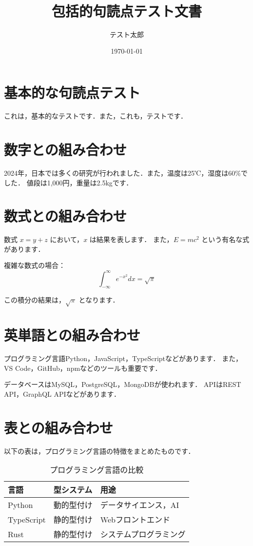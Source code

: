 \documentclass{article}
\title{包括的句読点テスト文書}
\author{テスト太郎}
\date{\today}
\begin{document}
\maketitle

\section{基本的な句読点テスト}

これは，基本的なテストです．また，これも，テストです．

\section{数字との組み合わせ}

2024年，日本では多くの研究が行われました．また，温度は25℃，湿度は60\%でした．
値段は1,000円，重量は2.5kgです．

\section{数式との組み合わせ}

数式 $x = y + z$ において，$x$ は結果を表します．
また，$E = mc^2$ という有名な式があります．

複雑な数式の場合：
\begin{equation}
\int_{-\infty}^{\infty} e^{-x^2} dx = \sqrt{\pi}
\end{equation}

この積分の結果は，$\sqrt{\pi}$ となります．

\section{英単語との組み合わせ}

プログラミング言語Python，JavaScript，TypeScriptなどがあります．
また，VS Code，GitHub，npmなどのツールも重要です．

データベースはMySQL，PostgreSQL，MongoDBが使われます．
APIはREST API，GraphQL APIなどがあります．

\section{表との組み合わせ}

以下の表は，プログラミング言語の特徴をまとめたものです．

\begin{table}[h]
\centering
\begin{tabular}{|l|l|l|}
\hline
言語 & 型システム & 用途 \\
\hline
Python & 動的型付け & データサイエンス，AI \\
TypeScript & 静的型付け & Webフロントエンド \\
Rust & 静的型付け & システムプログラミング \\
\hline
\end{tabular}
\caption{プログラミング言語の比較}
\end{table}
\end{document}
